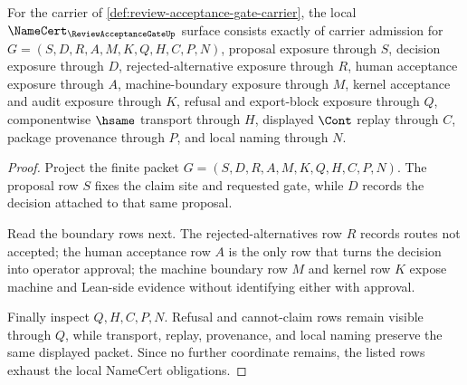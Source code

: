 \begin{theorem}
\label{thm:review-acceptance-gate-namecert-obligations}
For the carrier of \autoref{def:review-acceptance-gate-carrier}, the local $\NameCert_{\ReviewAcceptanceGateUp}$ surface consists exactly of carrier admission for $G=(S,D,R,A,M,K,Q,H,C,P,N)$, proposal exposure through $S$, decision exposure through $D$, rejected-alternative exposure through $R$, human acceptance exposure through $A$, machine-boundary exposure through $M$, kernel acceptance and audit exposure through $K$, refusal and export-block exposure through $Q$, componentwise $\hsame$ transport through $H$, displayed $\Cont$ replay through $C$, package provenance through $P$, and local naming through $N$.
\end{theorem}
\begin{proof}
Project the finite packet $G=(S,D,R,A,M,K,Q,H,C,P,N)$. The proposal row $S$ fixes the claim site and requested gate, while $D$ records the decision attached to that same proposal.

Read the boundary rows next. The rejected-alternatives row $R$ records routes not accepted; the human acceptance row $A$ is the only row that turns the decision into operator approval; the machine boundary row $M$ and kernel row $K$ expose machine and Lean-side evidence without identifying either with approval.

Finally inspect $Q,H,C,P,N$. Refusal and cannot-claim rows remain visible through $Q$, while transport, replay, provenance, and local naming preserve the same displayed packet. Since no further coordinate remains, the listed rows exhaust the local NameCert obligations.
\end{proof}

